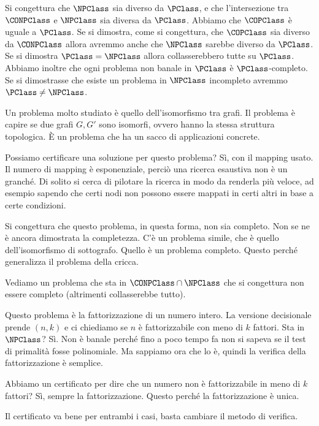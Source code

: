 Si congettura che $\NPClass$ sia diverso da $\PClass$, e che l'intersezione tra $\CONPClass$ e
$\NPClass$ sia diversa da $\PClass$. Abbiamo che $\COPClass$ è uguale a $\PClass$. Se si dimostra,
come si congettura, che $\COPClass$ sia diverso da $\CONPClass$ allora avremmo anche che $\NPClass$
sarebbe diverso da $\PClass$. Se si dimostra $\PClass = \NPClass$ allora
collasserebbero tutte su $\PClass$. Abbiamo inoltre che ogni problema non banale in $\PClass$ è
$\PClass$-completo. Se si dimostrasse che esiste un problema in $\NPClass$ incompleto avremmo
$\PClass \not= \NPClass$.

Un problema molto studiato è quello dell'isomorfismo tra grafi. Il problema è capire se due grafi
$G,G'$ sono isomorfi, ovvero hanno la stessa struttura topologica. È un problema che ha un sacco di
applicazioni concrete.

Possiamo certificare una soluzione per questo problema? Sì, con il mapping usato. Il numero di mapping
è esponenziale, perciò una ricerca esaustiva non è un granché. Di solito si cerca di pilotare la
ricerca in modo da renderla più veloce, ad esempio sapendo che certi nodi non possono essere
mappati in certi altri in base a certe condizioni.

Si congettura che questo problema, in questa forma, non sia completo. Non se ne è ancora dimostrata
la completezza. C'è un problema simile, che è quello dell'isomorfismo di sottografo. Quello è un
problema completo. Questo perché generalizza il problema della cricca.

Vediamo un problema che sta in $\CONPClass \cap \NPClass$ che si congettura non essere completo
(altrimenti collasserebbe tutto).

Questo problema è la fattorizzazione di un numero intero. La versione decisionale prende $(n,k)$ e
ci chiediamo se $n$ è fattorizzabile con meno di $k$ fattori. Sta in $\NPClass$? Sì. Non è banale
perché fino a poco tempo fa non si sapeva se il test di primalità fosse polinomiale. Ma sappiamo
ora che lo è, quindi la verifica della fattorizzazione è semplice.

Abbiamo un certificato per dire che un numero non è fattorizzabile in meno di $k$ fattori? Sì,
sempre la fattorizzazione. Questo perché la fattorizzazione è unica.

Il certificato va bene per entrambi i casi, basta cambiare il metodo di verifica.
